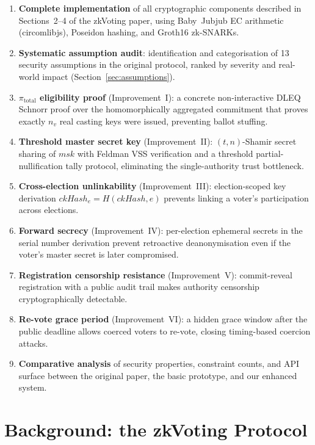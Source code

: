 \documentclass[conference]{IEEEtran}
\begin{document}
\begin{enumerate}
  \item \textbf{Complete implementation} of all cryptographic components
    described in Sections~2--4 of the zkVoting paper, using Baby~Jubjub EC
    arithmetic (circomlibjs), Poseidon hashing, and Groth16 zk-SNARKs.
  \item \textbf{Systematic assumption audit}: identification and categorisation
    of 13 security assumptions in the original protocol, ranked by severity
    and real-world impact (Section~\ref{sec:assumptions}).
  \item \textbf{$\pi_{\text{total}}$ eligibility proof} (Improvement~I): a
    concrete non-interactive DLEQ Schnorr proof over the homomorphically
    aggregated commitment that proves exactly $n_v$ real casting keys were
    issued, preventing ballot stuffing.
  \item \textbf{Threshold master secret key} (Improvement~II): $(t,n)$-Shamir
    secret sharing of $\mathit{msk}$ with Feldman VSS verification and a
    threshold partial-nullification tally protocol, eliminating the
    single-authority trust bottleneck.
  \item \textbf{Cross-election unlinkability} (Improvement~III): election-scoped
    key derivation $\mathit{ckHash}_e = H(\mathit{ckHash}, e)$ prevents
    linking a voter's participation across elections.
  \item \textbf{Forward secrecy} (Improvement~IV): per-election ephemeral
    secrets in the serial number derivation prevent retroactive
    deanonymisation even if the voter's master secret is later compromised.
  \item \textbf{Registration censorship resistance} (Improvement~V):
    commit-reveal registration with a public audit trail makes authority
    censorship cryptographically detectable.
  \item \textbf{Re-vote grace period} (Improvement~VI): a hidden grace
    window after the public deadline allows coerced voters to re-vote,
    closing timing-based coercion attacks.
  \item \textbf{Comparative analysis} of security properties, constraint counts,
    and API surface between the original paper, the basic prototype, and our
    enhanced system.
\end{enumerate}

\section{Background: the zkVoting Protocol}
\label{sec:background}
\end{document}
